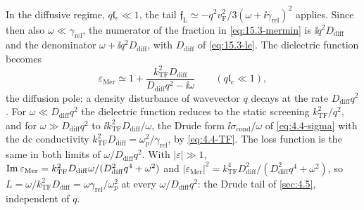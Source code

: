 In the diffusive regime, $q\mathfrak{l}_e \ll 1$, the tail $\mathfrak{f}_{\mathrm{L}} \simeq -q^2v_{\mathrm{F}}^2/3(\omega + \ii\gamma_{\mathrm{rel}})^2$ applies. Since then also $\omega \ll \gamma_{\mathrm{rel}}$, the numerator of the fraction in \cref{eq:15.3-mermin} is $\ii q^2D_{\mathrm{diff}}$ and the denominator $\omega + \ii q^2D_{\mathrm{diff}}$, with $D_{\mathrm{diff}}$ of \cref{eq:15.3-le}. The dielectric function becomes
\begin{equation}
  \varepsilon_{\mathrm{Mer}} \simeq 1 + \frac{k_{\mathrm{TF}}^2D_{\mathrm{diff}}}{D_{\mathrm{diff}}q^2 - \ii\omega} \qquad (q\mathfrak{l}_e \ll 1) ,
  \label{eq:15.3-diff}
\end{equation}
the diffusion pole: a density disturbance of wavevector $q$ decays at the rate $D_{\mathrm{diff}}q^2$. For $\omega \ll D_{\mathrm{diff}}q^2$ the dielectric function reduces to the static screening $k_{\mathrm{TF}}^2/q^2$, and for $\omega \gg D_{\mathrm{diff}}q^2$ to $\ii k_{\mathrm{TF}}^2D_{\mathrm{diff}}/\omega$, the Drude form $\ii\sigma_{\mathrm{cond}}/\omega$ of \cref{eq:4.4-sigma} with the dc conductivity $k_{\mathrm{TF}}^2D_{\mathrm{diff}} = \omega_p^2/\gamma_{\mathrm{rel}}$, by \cref{eq:4.4-TF}. The loss function is the same in both limits of $\omega/D_{\mathrm{diff}}q^2$. With $|\varepsilon| \gg 1$, $\operatorname{Im}\varepsilon_{\mathrm{Mer}} = k_{\mathrm{TF}}^2D_{\mathrm{diff}}\omega/(D_{\mathrm{diff}}^2q^4 + \omega^2)$ and $|\varepsilon_{\mathrm{Mer}}|^2 = k_{\mathrm{TF}}^4D_{\mathrm{diff}}^2/(D_{\mathrm{diff}}^2q^4 + \omega^2)$, so $L = \omega/k_{\mathrm{TF}}^2D_{\mathrm{diff}} = \omega\gamma_{\mathrm{rel}}/\omega_p^2$ at every $\omega/D_{\mathrm{diff}}q^2$: the Drude tail of \cref{sec:4.5}, independent of $q$.

